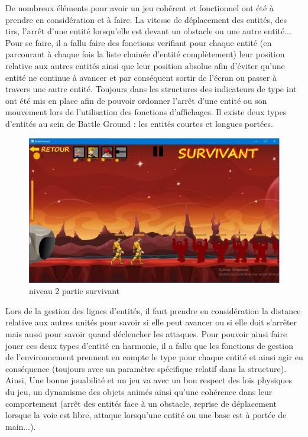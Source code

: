 \documentclass[a4paper,11pt]{article}
\begin{document}
De nombreux éléments pour avoir un jeu cohérent et fonctionnel ont été à prendre en considération et à faire. La vitesse de déplacement des entités,
des tirs, l'arrêt d'une entité lorsqu'elle est devant un obstacle ou une autre entité... Pour se faire, il a fallu faire des fonctions verifiant pour chaque
entité (en parcourant à chaque fois la liste chainée d'entité complètement) leur position relative aux autres entités ainsi que leur position absolue afin
d'éviter qu'une entité ne continue à avancer et par conséquent sortir de l'écran ou passer à travers une autre entité. Toujours dans les structures des indicateurs
de type int ont été mis en place afin de pouvoir ordonner l'arrêt d'une entité ou son mouvement lors de l'utilisation des fonctions d'affichages.
Il existe deux types d'entités au sein de Battle Ground : les entités courtes et longues portées.
\begin{figure}[h!]
\centering
\includegraphics [width=1\textwidth]{image4.jpg} 
\caption {\label{image} niveau 2 partie survivant}
\end{figure}
 \smallbreak
Lors de la gestion des lignes d'entités, il faut prendre en considération la distance relative aux autres unités pour savoir si elle peut avancer ou si elle doit
s'arrêter mais aussi pour savoir quand déclencher les attaques. Pour pouvoir ainsi faire jouer ces deux types d'entité en harmonie, il a fallu
que les fonctions de gestion de l'environnement prennent en compte le type pour chaque entité et ainsi agir en conséquence (toujours avec un paramètre spécifique relatif dans la structure).
Ainsi, Une bonne jouabilité et un jeu  va avec un bon respect des lois physiques du jeu, un dynamisme des objets animés ainsi qu'une cohérence dans leur comportement (arrêt des entités face à un obstacle,
reprise de déplacement lorsque la voie est libre, attaque lorsqu'une entité ou une base est à portée de main...).
\end{document}
